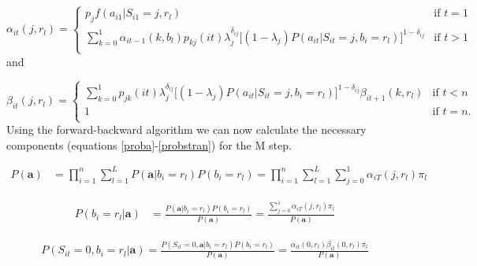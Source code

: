 \documentclass[num-refs]{wiley-article}
\begin{document}
\begin{equation} \label{fwd}
    \alpha_{it}(j,r_l) = \begin{cases}
        p_{j} f(a_{i1}|S_{i1}=j,r_l) & \text{if } t = 1 \\
        \sum_{k=0}^1 \alpha_{it-1} (k,b_l)p_{kj}(it)\lambda_j^{\delta_{ij}} \big[(1-\lambda_j)P(a_{it}|S_{it}=j,b_i=r_l)\big]^{1-\delta_{ij}}
            & \text{if } t > 1\\
    \end{cases}
\end{equation}
and
    
\begin{equation} \label{bkwd}
\beta_{it}(j,r_l) = \begin{cases} 
    \sum_{k=0}^1p_{jk}(it)\lambda_j^{\delta_{ij}} \big[(1-\lambda_j)P(a_{it}|S_{it}=j,b_i=r_l)\big]^{1-\delta_{ij}}\beta_{it+1}(k,r_l) 
        & \text{if } t < n \\
    1 & \text{if } t = n. \\
\end{cases}
\end{equation}
Using the forward-backward algorithm we can now calculate the necessary components (equations \ref{proba}-\ref{probstran}) for the M step. 


\begin{equation}\label{proba}
\begin{split}
    P(\textbf{a}) & = \prod_{i=1}^n \sum_{l=1}^L 
        P(\textbf{a}|b_{i}=r_l)P(b_{i}=r_l) = 
    \prod_{i=1}^n \sum_{l=1}^L \sum_{j=0}^1 \alpha_{iT}(j,r_l)\pi_l 
\end{split}
\end{equation}

\begin{equation}\label{probl}
\begin{split}
    P(b_{i}=r_l|\textbf{a}) & = \frac{P(\textbf{a}|b_{i}=r_l)P(b_{i}=r_l)}{P(\textbf{a})} = 
    \frac{\sum_{j=0}^1 \alpha_{iT}(j,r_l)\pi_l }{P(\textbf{a})}  
\end{split}
\end{equation}

\begin{equation}\label{probs0}
\begin{split}
    P(S_{it}=0,b_{i}=r_l|\textbf{a}) = \frac{P(S_{it}=0,\textbf{a}|b_{i}=r_l)
        P(b_{i}=r_l)}{P(\textbf{a})} = 
    \frac{\alpha_{it}(0,r_l)\beta_{it}(0,r_l)\pi_l }{P(\textbf{a})} 
\end{split}
\end{equation}
\end{document}
